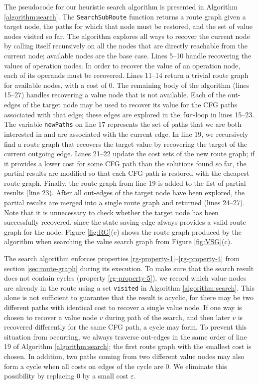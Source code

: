 \documentclass[12pt]{gatech-thesis}
\begin{document}
The pseudocode for our heuristic search algorithm is presented in Algorithm \ref{algorithm:search}. 
The {\tt SearchSubRoute} function returns a route graph given a target node, the paths for which that node must be restored, and the set of value nodes visited so far.
The algorithm explores all ways to recover the current node by calling itself recursively on all the nodes that are directly reachable from the current node; available nodes are the base case.
Lines 5--10 handle recovering the values of operation nodes. 
In order to recover the value of an operation node, each of its operands must be recovered.
Lines 11--14 return a trivial route graph for available nodes, with a cost of 0. 
The remaining body of the algorithm (lines 15--27) handles recovering a value node that is not available.
Each of the out-edges of the target node may be used to recover its value for the CFG paths associated with that edge; these edges are explored in the {\tt for}-loop in lines 15--23.
The variable {\tt newPaths} on line 17 represents the set of paths that we are both interested in and are associated with the current edge. 
In line 19, we recursively find a route graph that recovers the target value by recovering the target of the current outgoing edge.
Lines 21--22 update the cost sets of the new route graph; if it provides a lower cost for some CFG path than the solutions found so far, the partial results are modified so that each CFG path is restored with the cheapest route graph.
Finally, the route graph from line 19 is added to the list of partial results (line 23). 
After all out-edges of the target node have been explored, the partial results are merged into a single route graph and returned (lines 24--27).
Note that it is unnecessary to check whether the target node has been successfully recovered, since the state saving edge always provides a valid route graph for the node. 
Figure \ref{fig:RG}(c) shows the route graph produced by the algorithm when searching the value search graph from Figure \ref{fig:VSG}(c).

The search algorithm enforces properties \ref{rg-property-1}--\ref{rg-property-4} from section \ref{sec:route-graph} during its execution.
To make sure that the search result does not contain cycles (property \ref{rg-property-5}), we record which value nodes are already in the route using a set \texttt{visited} in Algorithm \ref{algorithm:search}. 
This alone is not sufficient to guarantee that the result is acyclic, for there may be two different paths with identical cost to recover a single value node. 
If one way is chosen to recover a value node $v$ during path of the search, and then later $v$ is recovered differently for the same CFG path, a cycle may form.
To prevent this situation from occurring, we always traverse out-edges in the same order of line 19 of Algorithm \ref{algorithm:search}; the first route graph with the smallest cost is chosen. In addition, two paths coming from two different value nodes may also form a cycle when all costs on edges of the cycle are 0. We eliminate this possibility by replacing 0 by a small cost $\varepsilon$.
\end{document}
